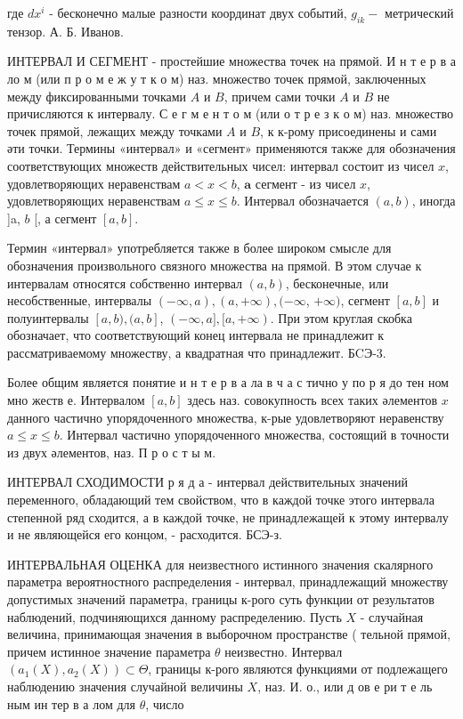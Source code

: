 \documentclass[10pt]{article}
\begin{document}
где $d x^{i}$ - бесконечно малые разности координат двух событий, $g_{i k}-$ метрический тензор. А. Б. Иванов.



ИНТЕРВАЛ И СЕГМЕНТ - простейшие множества точек на прямой. И н т е р в а ло м (или п р о м е ж у т к о м) наз. множество точек прямой, заключенных между фиксированными точками $A$ и $B$, причем сами точки $A$ и $B$ не причисляются к интервалу. С е г м е н т о м (или о т р е з к о м) наз. множество точек прямой, лежащих между точками $A$ и $B$, к к-рому присоединены и сами әти точки. Термины «интервал» и «сегмент» применяются также для обозначения соответствующих множеств действительных чисел: интервал состоит из чисел $x$, удовлетворяющих неравенствам $a<x<b$, $\mathbf{a}$ сегмент - из чисел $x$, удовлетворяющих неравенствам $a \leqslant x \leqslant b$. Интервал обозначается $(a, b)$, иногда ]a, $b$ [, а сегмент $[a, b]$.



Термин «интервал» употребляется также в более широком смысле для обозначения произвольного связного множества на прямой. В этом случае к интервалам относятся собственно интервал $(a, b)$, бесконечные, или несобственные, интервалы $(-\infty, a),(a,+\infty),(-\infty$, $+\infty)$, сегмент $[a, b]$ и полуинтервалы $[a, b),(a, b]$, $(-\infty, a],[a,+\infty)$. При этом круглая скобка обозначает, что соответствующий конец интервала не принадлежит к рассматриваемому множеству, а квадратная что принадлежит. БCЭ-3.



Более общим является понятие и н т е р в а ла в ч а с тично у по р я до тен ном мно жеств е. Интервалом $[a, b]$ здесь наз. совокупность всех таких әлементов $x$ данного частично упорядоченного множества, к-рые удовлетворяют неравенству $a \leqslant x \leqslant b$. Интервал частично упорядоченного множества, состоящий в точности из двух әлементов, наз. П р о с т ы м.



ИНТЕРВАЛ СХОДИМОСТИ р я д а - интервал действительных значений переменного, обладающий тем свойством, что в каждой точке этого интервала степенной ряд сходится, а в каждой точке, не принадлежащей к этому интервалу и не являющейся его концом, - расходится. БСЭ-з.



ИНТЕРВАЛЬНАЯ ОЦЕНКА для неизвестного истинного значения скалярного параметра вероятностного распределения - интервал, принадлежащий множеству допустимых значений параметра, границы к-рого суть функции от результатов наблюдений, подчиняющихся данному распределению. Пусть $X$ - случайная величина, принимающая значения в выборочном пространстве ( тельной прямой, причем истинное значение параметра $\theta$ неизвестно. Интервал $\left(a_{1}(X), a_{2}(X)\right) \subset \Theta$, границы к-рого являются функциями от подлежащего наблюдению значения случайной величины $X$, наз. И. о., или д ов е ри т е ль ным ин тер в а лом для $\theta$, число
\end{document}

